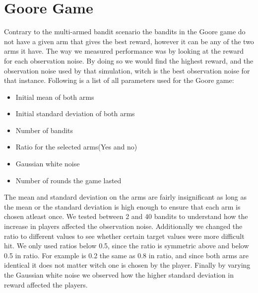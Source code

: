 \section{Goore Game}
Contrary to the multi-armed bandit scenario the bandits in the Goore game do not have a given arm that gives the best reward, however it can be any of the two arms it have. The way we measured performance was by looking at the reward for each observation noise. By doing so we would find the highest reward, and the observation noise used by that simulation, witch is the best observation noise for that instance. Following is a list of all parameters used for the Goore game:
\begin{itemize}
\item Initial mean of both arms
\item Initial standard deviation of both arms
\item Number of bandits
\item Ratio for the selected arms(Yes and no)
\item Gaussian white noise
\item Number of rounds the game lasted
\end{itemize}

The mean and standard deviation on the arms are fairly insignificant as long as the mean or the standard deviation is high enough to ensure that each arm is chosen atleast once. We tested between 2 and 40 bandits to understand how the increase in players affected the observation noise. Additionally we changed the ratio to different values to see whether certain target values were more difficult hit. We only used ratios below 0.5, since the ratio is symmetric above and below 0.5 in ratio. For example is 0.2 the same as 0.8 in ratio, and since both arms are identical it does not matter witch one is chosen by the player. Finally by varying the Gaussian white noise we observed how the higher standard deviation in reward affected the players.




